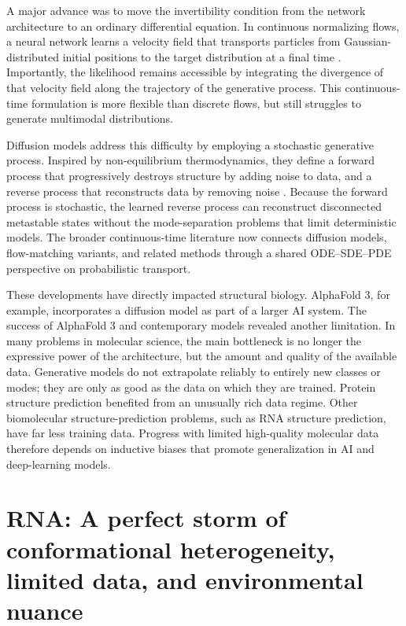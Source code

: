 A major advance was to move the invertibility condition from the network architecture to an ordinary differential equation. In continuous normalizing flows, a neural network learns a velocity field that transports particles from Gaussian-distributed initial positions to the target distribution at a final time \citep{Grathwohl2018FFJORD}. Importantly, the likelihood remains accessible by integrating the divergence of that velocity field along the trajectory of the generative process. This continuous-time formulation is more flexible than discrete flows, but still struggles to generate multimodal distributions.

Diffusion models address this difficulty by employing a stochastic generative process. Inspired by non-equilibrium thermodynamics, they define a forward process that progressively destroys structure by adding noise to data, and a reverse process that reconstructs data by removing noise \citep{SohlDickstein2015NonEq,Ho2020DDPM,Song2021ScoreBased}. Because the forward process is stochastic, the learned reverse process can reconstruct disconnected metastable states without the mode-separation problems that limit deterministic models. The broader continuous-time literature now connects diffusion models, flow-matching variants, and related methods through a shared ODE--SDE--PDE perspective on probabilistic transport.

These developments have directly impacted structural biology. AlphaFold 3, for example, incorporates a diffusion model as part of a larger AI system. The success of AlphaFold 3 and contemporary models revealed another limitation. In many problems in molecular science, the main bottleneck is no longer the expressive power of the architecture, but the amount and quality of the available data. Generative models do not extrapolate reliably to entirely new classes or modes; they are only as good as the data on which they are trained. Protein structure prediction benefited from an unusually rich data regime. Other biomolecular structure-prediction problems, such as RNA structure prediction, have far less training data. Progress with limited high-quality molecular data therefore depends on inductive biases that promote generalization in AI and deep-learning models.

\section{RNA: A perfect storm of conformational heterogeneity, limited data, and environmental nuance}
\label{ch1:sec:rna-limited-data}

